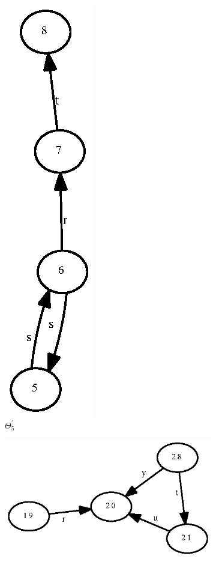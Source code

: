 \documentclass[a4paper,12pt]{article}
\numberwithin{equation}{section}
\numberwithin{figure}{section}
\begin{document}
\begin{figure}
\begin{center}
\begin{subfigure}[b]{.3\columnwidth}
\includegraphics[scale=0.5, angle=90, bb=0 0  82 280]{python/ex_K_i4.eps}
\caption{$\Theta_5^\prime$}
\label{fig:K_i4}
\end{subfigure}
\hspace*{2cm}
\begin{subfigure}[b]{.3\columnwidth}
\includegraphics[scale=0.5, angle=90, bb=0 0 82 210]{python/ex_K_j4.eps}

\end{subfigure}
\end{center}
\end{figure}
\end{document}
